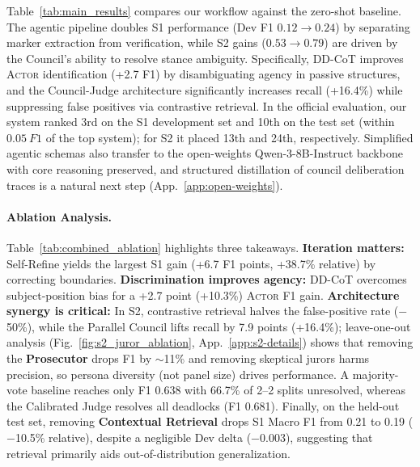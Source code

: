 \documentclass[11pt]{article}
\begin{document}
Table~\ref{tab:main_results} compares our workflow against the zero-shot baseline. The agentic pipeline doubles S1 performance 
(Dev F1 $0.12 \rightarrow 0.24$) by separating marker extraction from verification, while S2 gains ($0.53 \rightarrow 0.79$) 
are driven by the Council's ability to resolve stance ambiguity. Specifically, DD-CoT improves \textsc{Actor} identification (+2.7 F1) 
by disambiguating agency in passive structures, and the Council-Judge architecture significantly increases recall (+16.4\%) while suppressing 
false positives via contrastive retrieval. In the official evaluation, our system ranked 3rd on the S1 development set and 10th on the test set (within $0.05~F1$ of the top system); for S2 it placed 13th and 24th, respectively. Simplified agentic schemas also transfer to the open-weights Qwen-3-8B-Instruct backbone with core reasoning preserved, and structured distillation of council deliberation traces is a natural next step (App.~\ref{app:open-weights}).



\paragraph{Ablation Analysis.}

Table~\ref{tab:combined_ablation} highlights three takeaways. \textbf{Iteration
	matters:} Self-Refine yields the largest S1 gain (+6.7 F1 points, +38.7\% relative) by correcting
boundaries. \textbf{Discrimination improves agency:} DD-CoT overcomes
subject-position bias for a +2.7 point (+10.3\%) \textsc{Actor} F1 gain. \textbf{Architecture synergy is
	critical:} In S2, contrastive retrieval halves the false-positive rate ($-$50\%), while the Parallel Council lifts recall by 7.9 points (+16.4\%); leave-one-out analysis (Fig.~\ref{fig:s2_juror_ablation}, App.~\ref{app:s2-details}) shows that removing the \textbf{Prosecutor} drops F1 by $\sim$11\% and removing skeptical jurors harms precision, so persona diversity (not panel size) drives performance. A majority-vote baseline reaches only F1 0.638 with 66.7\% of 2--2 splits unresolved, whereas the Calibrated Judge resolves all deadlocks (F1 0.681). Finally, on the held-out test set, removing \textbf{Contextual Retrieval} drops S1 Macro F1 from 0.21 to 0.19 ($-$10.5\% relative), despite a negligible Dev delta ($-0.003$), suggesting that retrieval primarily aids out-of-distribution generalization.
\end{document}

